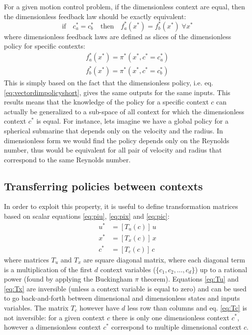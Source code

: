 For a given motion control problem, if the dimensionless context are equal, then the dimensionless feedback law should be exactly equivalent:
\begin{equation}
\text{if} \quad c_a^* = c_b^*  \quad \text{then} \quad f_a^*(x^*) = f_b^*(x^*) \; \forall x^*   
\end{equation}
where dimensionless feedback laws are defined as slices of the dimensionless policy for specific contexts:
\begin{align}
f_a^*(x^*) = \pi^*( x^* , c^* = c_a^*)\\
f_b^*(x^*) = \pi^*( x^* , c^* = c_b^*)
\end{align}
This is simply based on the fact that the dimensionless policy, i.e. eq. \eqref{eq:vectordimpolicyshort}, gives the same outputs for the same inputs. This results means that the knowledge of the policy for a specific context $c$ can actually be generalized to a sub-space of all context for which the dimensionless context $c^*$ is equal. For instance, lets imagine we have a global policy for a spherical submarine that depends only on the velocity and the radius. In dimensionless form we would find the policy depends only on the Reynolds number, thus would be equivalent for all pair of velocity and radius that correspond to the same Reynolds number.

\subsection{Transferring policies between contexts}

In order to exploit this property, it is useful to define transformation matrices based on scalar equations \eqref{eq:piu}, \eqref{eq:pix} and \eqref{eq:pic}:
\begin{align}
u^* &= \left[ T_u(c) \right] \, u  \label{eq:Tu} \\
x^* &= \left[ T_x(c) \right] \, x \label{eq:Tx} \\
c^* &= \left[ T_c(c) \right] \, c \label{eq:Tc}
\end{align}
where matrices $T_u$ and $T_x$ are square diagonal matrix, where each diagonal term is a multiplication of the first $d$ context variables ($\{c_1, c_2 , \hdots,c_d\}$) up to a rational power (found by applying the Buckingham $\pi$ theorem). Equations \eqref{eq:Tu} and \eqref{eq:Tx} are inversible (unless a context variable is equal to zero) and can be used to go back-and-forth between dimensional and dimensionless states and inputs variables. The matrix $T_c$ however have $d$ less row than columns and eq. \eqref{eq:Tc} is not inversible: for a given context $c$ there is only one dimensionless context $c^*$, however a dimensionless context $c^*$ correspond to multiple dimensional context $c$.

